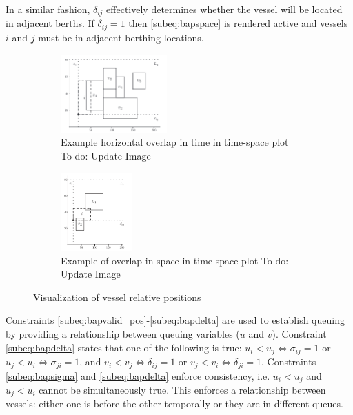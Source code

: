 \documentclass[letterpaper, 10pt, conference]{IEEEtran}
\newcommand{\TODO}[1]{{\color{green} To do: #1}} %
\begin{document}
In a similar fashion, \(\delta_{ij}\) effectively determines whether the vessel will be located in adjacent berths. If \(\delta_{ij} = 1\) then \eqref{subeq:bapspace} is rendered active and vessels \(i\) and \(j\) must be in adjacent berthing locations.


\begin{figure}
    \centering
    \begin{subfigure}[b]{0.2\textwidth}
        \centering
    	\includegraphics[height=3cm]{hoizontaloverlap.png}
    	\caption{Example horizontal overlap in time in time-space plot\TODO{Update Image}}
    	\label{subfig:timeoverlap}
	\end{subfigure}
	\hfill
    \begin{subfigure}[b]{0.2\textwidth}
        \centering
    	\includegraphics[height=3cm]{verticaloverlap.png}
    	\caption{Example of overlap in space in time-space plot\TODO{Update Image}}
    	\label{subfig:spaceoverlap}
	\end{subfigure}
	\caption{Visualization of vessel relative positions}
	\label{fig:overlap}
\end{figure}

Constraints \ref{subeq:bapvalid_pos}-\ref{subeq:bapdelta} are used to establish queuing by providing a relationship between queuing variables (\(u\) and \(v\)). Constraint \eqref{subeq:bapdelta} states that one of the following is true: \(u_i < u_j \iff \sigma_{ij} = 1\) or \(u_j < u_i \iff \sigma_{ji} = 1\), and \(v_i < v_j \iff \delta_{ij} = 1\) or \(v_j < v_i \iff \delta_{ji} = 1\). Constraints \eqref{subeq:bapsigma} and \eqref{subeq:bapdelta} enforce consistency, i.e. \(u_i < u_j\) and \(u_j < u_i\) cannot be simultaneously true. This enforces a relationship between vessels: either one is before the other temporally or they are in different queues.
\end{document}
